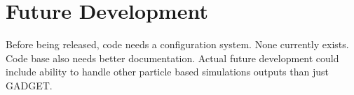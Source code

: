 \section{Future Development}
\label{future}
Before being released, code needs a configuration system.  None currently exists.  Code base also needs better documentation.  Actual future development could include ability to handle other particle based simulations outputs than just GADGET.